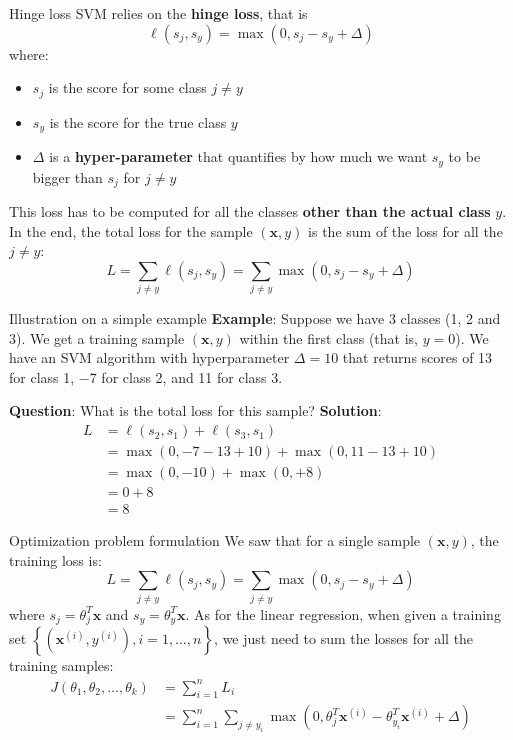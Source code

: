 \documentclass{beamer}
\newcommand{\1}[1]{\mathbbm{1}\left[#1\right]}
\newcommand{\yi}{y^{(i)}}
\newcommand{\bx}{\bm{x}}
\newcommand{\bxi}{\bx^{(i)}}
\newcommand{\pv}{\pause\vfill}
\begin{document}
\begin{frame}{Hinge loss}
SVM relies on the \textbf{hinge loss}, that is
\begin{equation*}
\ell(s_j, s_y) = \max(0, s_j - s_y + \Delta)
\end{equation*}
where:
\begin{itemize}
	\item $s_j$ is the score for some class $j \neq y$
	\item $s_y$ is the score for the true class $y$
	\item $\Delta$ is a \textbf{hyper-parameter} that quantifies by how much we want $s_y$ to be bigger than $s_j$ for $j \neq y$
\end{itemize}
\pv
This loss has to be computed for all the classes \textbf{other than the actual class }$y$. In the end, the total loss for the sample $(\bx, y)$ is the sum of the loss for all the $j \neq y$:
\begin{equation*}
L = \sum_{j \neq y} \ell(s_j, s_y) = \sum_{j \neq y} \max(0, s_j - s_y + \Delta)
\end{equation*}
\end{frame}

\begin{frame}{Illustration on a simple example}
\textbf{Example}: Suppose we have 3 classes (1, 2 and 3). We get a training sample $(\bx, y)$ within the first class (that is, $y = 0$). We have an SVM algorithm with hyperparameter $\Delta = 10$ that returns scores of 13 for class 1, −7 for class 2, and 11 for class 3. 

\textbf{Question}: What is the total loss for this sample?
\pv
\textbf{Solution}: 
\begin{equation*}
\begin{split}
L 	&=  \ell(s_2, s_1) + \ell(s_3, s_1) \\
	&= \max(0,−7−13+10) + \max(0,11−13+10) \\
	&= \max(0, -10) + \max(0, +8) \\
	&= 0 + 8 \\
	&= 8
\end{split}
\end{equation*}
\end{frame}

\begin{frame}{Optimization problem formulation}
We saw that for a single sample $(\bx, y)$, the training loss is:
\begin{equation*}
L = \sum_{j \neq y} \ell(s_j, s_y) = \sum_{j \neq y} \max(0, s_j - s_y + \Delta)
\end{equation*}
where $s_j = \theta_j^T \bx$ and $s_y = \theta_y^T \bx$.
\pv
As for the linear regression, when given a training set $\left\{ (\bxi, \yi), i =1, \dots, n\right\}$, we just need to sum the losses for all the training samples:
\begin{equation*}
\begin{split}
J(\theta_1, \theta_2, \dots, \theta_k) 
	&= \sum_{i = 1}^n L_i \\
	&= \sum_{i = 1}^n \sum_{j \neq y_i} \max(0, \theta_j^T\bxi - \theta_{y_i}^T\bxi + \Delta)
\end{split}
\end{equation*}
\end{frame}
\end{document}
